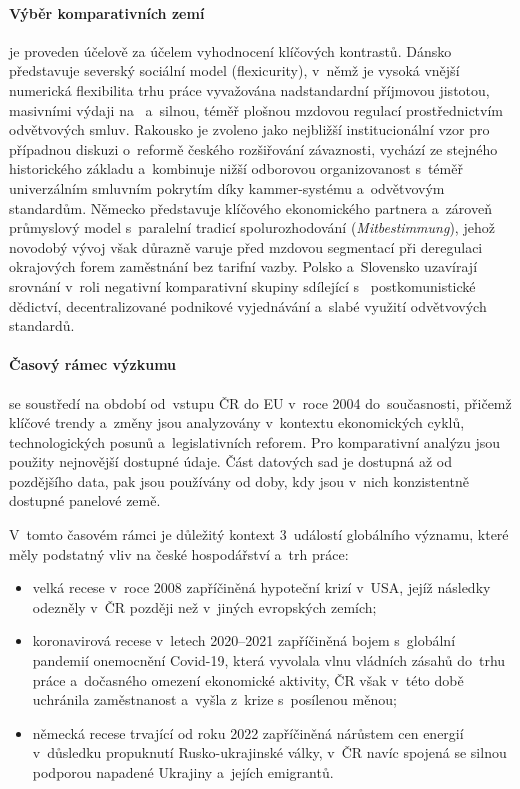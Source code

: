 \paragraph{Výběr komparativních zemí}\label{par:vyber_zemi} je proveden účelově za účelem vyhodnocení klíčových kontrastů. Dánsko představuje severský sociální model (flexicurity), v~němž je vysoká vnější numerická flexibilita trhu práce vyvažována nadstandardní příjmovou jistotou, masivními výdaji na~ a~silnou, téměř plošnou mzdovou regulací prostřednictvím odvětvových smluv. Rakousko je zvoleno jako nejbližší institucionální vzor pro případnou diskuzi o~reformě českého rozšiřování závaznosti, vychází ze stejného historického základu a~kombinuje nižší odborovou organizovanost s~téměř univerzálním smluvním pokrytím díky kammer-systému a~odvětvovým standardům. Německo představuje klíčového ekonomického partnera  a~zároveň průmyslový model s~paralelní tradicí spolurozhodování (\emph{Mitbestimmung}), jehož novodobý vývoj však důrazně varuje před mzdovou segmentací při deregulaci okrajových forem zaměstnání bez tarifní vazby. Polsko a~Slovensko uzavírají srovnání v~roli negativní komparativní skupiny sdílející s~ postkomunistické dědictví, decentralizované podnikové vyjednávání a~slabé využití odvětvových standardů.

\paragraph{Časový rámec výzkumu}\label{par:casovy_ramec} se soustředí na období od~vstupu \acs{ČR} do \acs{EU} v~roce 2004 do~současnosti, přičemž klíčové trendy a~změny jsou analyzovány v~kontextu ekonomických cyklů, technologických posunů a~legislativních reforem. Pro komparativní analýzu jsou použity nejnovější dostupné údaje. Část datových sad je dostupná až od pozdějšího data, pak jsou používány od doby, kdy jsou v~nich konzistentně dostupné panelové země.\par
V~tomto časovém rámci je důležitý kontext 3~událostí globálního významu, které měly podstatný vliv na české hospodářství a~trh práce:
\begin{itemize}[noitemsep]
  \item velká recese v~roce 2008 zapříčiněná hypoteční krizí v~USA, jejíž následky odezněly v~\acs{ČR} později než v~jiných evropských zemích;
  \item koronavirová recese v~letech 2020--2021 zapříčiněná bojem s~globální pandemií onemocnění Covid-19, která vyvolala vlnu vládních zásahů do~trhu práce a~dočasného omezení ekonomické aktivity, \acs{ČR} však v~této době uchránila zaměstnanost a~vyšla z~krize s~posílenou měnou;
  \item německá recese trvající od roku 2022 zapříčiněná nárůstem cen energií v~důsledku propuknutí Rusko-ukrajinské války, v~\acs{ČR} navíc spojená se silnou podporou napadené Ukrajiny a~jejích emigrantů.
\end{itemize}


